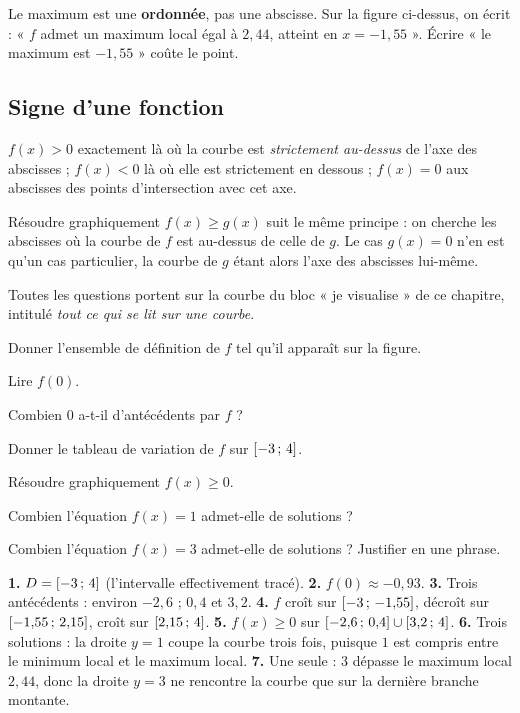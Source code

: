 \begin{erreurclassique}
Le maximum est une \textbf{ordonnée}, pas une abscisse. Sur la figure
ci-dessus, on écrit : « $f$ admet un maximum local égal à $2{,}44$, atteint
en $x = -1{,}55$ ». Écrire « le maximum est $-1{,}55$ » coûte le point.
\end{erreurclassique}

\subsection{Signe d'une fonction}

\begin{propriete}
$f(x) > 0$ exactement là où la courbe est \emph{strictement au-dessus} de
l'axe des abscisses ; $f(x) < 0$ là où elle est strictement en dessous ;
$f(x) = 0$ aux abscisses des points d'intersection avec cet axe.
\end{propriete}

\begin{remarque}
Résoudre graphiquement $f(x) \geq g(x)$ suit le même principe : on cherche
les abscisses où la courbe de $f$ est au-dessus de celle de $g$. Le cas
$g(x) = 0$ n'en est qu'un cas particulier, la courbe de $g$ étant alors
l'axe des abscisses lui-même.
\end{remarque}

\begin{entrainement}
Toutes les questions portent sur la courbe du bloc « je visualise » de ce
chapitre, intitulé \emph{tout ce qui se lit sur une courbe}.

\exo[\niveau{1}] Donner l'ensemble de définition de $f$ tel qu'il apparaît
sur la figure.

\exo[\niveau{1}] Lire $f(0)$.

\exo[\niveau{1}] Combien $0$ a-t-il d'antécédents par $f$ ?

\exo[\niveau{2}] Donner le tableau de variation de $f$ sur
$\left[-3\,;\,4\right]$.

\exo[\niveau{2}] Résoudre graphiquement $f(x) \geq 0$.

\exo[\niveau{2}] Combien l'équation $f(x) = 1$ admet-elle de solutions ?

\exo[\niveau{3}] Combien l'équation $f(x) = 3$ admet-elle de solutions ?
Justifier en une phrase.
\end{entrainement}

\begin{corrige}
\textbf{1.} $D = \left[-3\,;\,4\right]$ (l'intervalle effectivement tracé).
\textbf{2.} $f(0) \approx -0{,}93$.
\textbf{3.} Trois antécédents : environ $-2{,}6$ ; $0{,}4$ et $3{,}2$.
\textbf{4.} $f$ croît sur $\left[-3\,;\,-1{,}55\right]$, décroît sur
$\left[-1{,}55\,;\,2{,}15\right]$, croît sur $\left[2{,}15\,;\,4\right]$.
\textbf{5.} $f(x) \geq 0$ sur
$\left[-2{,}6\,;\,0{,}4\right]\cup\left[3{,}2\,;\,4\right]$.
\textbf{6.} Trois solutions : la droite $y = 1$ coupe la courbe trois fois,
puisque $1$ est compris entre le minimum local et le maximum local.
\textbf{7.} Une seule : $3$ dépasse le maximum local $2{,}44$, donc la
droite $y = 3$ ne rencontre la courbe que sur la dernière branche montante.
\end{corrige}


